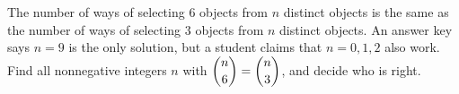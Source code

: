 The number of ways of selecting $6$ objects from $n$ distinct objects is the same as the number of ways of selecting $3$ objects from $n$ distinct objects. An answer key says $n=9$ is the only solution, but a student claims that $n=0,1,2$ also work. Find all nonnegative integers $n$ with $\dbinom n6=\dbinom n3$, and decide who is right.
